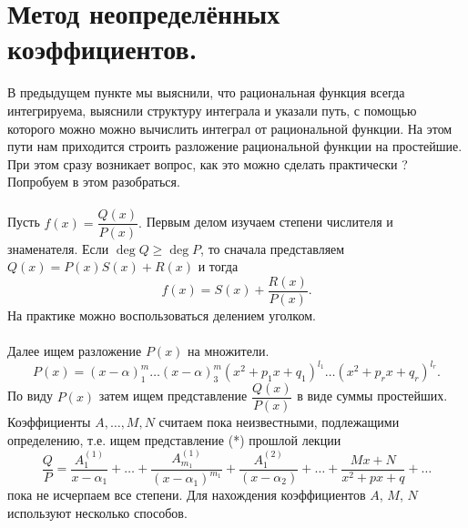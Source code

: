 \section{Метод неопределённых коэффициентов.}
В предыдущем пункте мы выяснили, что рациональная функция всегда интегрируема, выяснили структуру интеграла и указали путь, с помощью которого можно можно вычислить интеграл от рациональной функции. На этом пути нам приходится строить разложение рациональной функции на простейшие. При этом сразу возникает вопрос, как это можно сделать практически ? Попробуем в этом разобраться.\\\\
Пусть $ f(x) = \dfrac{Q(x)}{P(x)}. $ Первым делом изучаем степени числителя и знаменателя. Если $ \deg Q \geqslant \deg P $, то сначала представляем $ Q(x) = P(x) S(x) + R(x) $ и тогда $$ f(x) = S(x) + \frac{R(x)}{P(x)} .$$
На практике можно воспользоваться делением уголком.\\\\
Далее ищем разложение $P(x)$ на множители.
$$ P(x) = (x - \alpha)^m_1 \ldots (x - \alpha)^m_3(x^2 + p_1x + q_1)^{l_1} \ldots (x^2 + p_rx + q_r)^{l_r}. $$
По виду $P(x)$ затем ищем представление $ \dfrac{Q(x)}{P(x)} $ в виде суммы простейших. Коэффициенты $ A, \ldots , M, N $ считаем пока неизвестными, подлежащими определению, т.е. ищем представление (*) прошлой лекции $$ \frac{Q}{P} = \frac{A_1^{(1)}}{x - \alpha_1} + \ldots + \frac{A_{m_1}^{(1)}}{(x - \alpha_1)^{m_1}} + \frac{A_1^{(2)}}{(x - \alpha_2)} + \ldots + \frac{Mx + N}{x^2 + px + q} + \ldots $$
пока не исчерпаем все степени. 
Для нахождения коэффициентов $A$, $M$, $N$ используют несколько способов.
